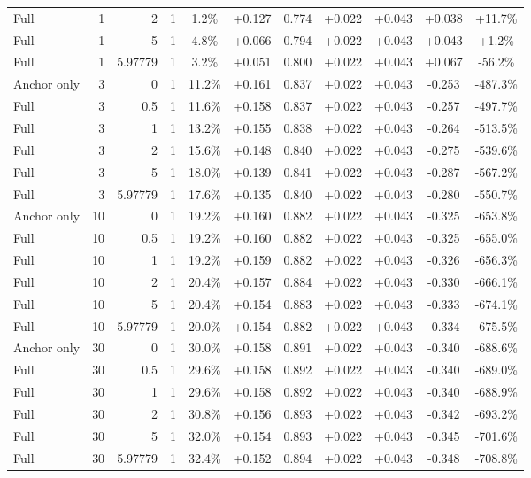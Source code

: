\begin{table}[htbp]
\begin{tabular}{lrrrccccccc}
Full & 1 & 2 & 1 & 1.2\% & +0.127 & 0.774 & +0.022 & +0.043 & +0.038 & +11.7\% \\
Full & 1 & 5 & 1 & 4.8\% & +0.066 & 0.794 & +0.022 & +0.043 & +0.043 & +1.2\% \\
Full & 1 & 5.97779 & 1 & 3.2\% & +0.051 & 0.800 & +0.022 & +0.043 & +0.067 & -56.2\% \\
Anchor only & 3 & 0 & 1 & 11.2\% & +0.161 & 0.837 & +0.022 & +0.043 & -0.253 & -487.3\% \\
Full & 3 & 0.5 & 1 & 11.6\% & +0.158 & 0.837 & +0.022 & +0.043 & -0.257 & -497.7\% \\
Full & 3 & 1 & 1 & 13.2\% & +0.155 & 0.838 & +0.022 & +0.043 & -0.264 & -513.5\% \\
Full & 3 & 2 & 1 & 15.6\% & +0.148 & 0.840 & +0.022 & +0.043 & -0.275 & -539.6\% \\
Full & 3 & 5 & 1 & 18.0\% & +0.139 & 0.841 & +0.022 & +0.043 & -0.287 & -567.2\% \\
Full & 3 & 5.97779 & 1 & 17.6\% & +0.135 & 0.840 & +0.022 & +0.043 & -0.280 & -550.7\% \\
Anchor only & 10 & 0 & 1 & 19.2\% & +0.160 & 0.882 & +0.022 & +0.043 & -0.325 & -653.8\% \\
Full & 10 & 0.5 & 1 & 19.2\% & +0.160 & 0.882 & +0.022 & +0.043 & -0.325 & -655.0\% \\
Full & 10 & 1 & 1 & 19.2\% & +0.159 & 0.882 & +0.022 & +0.043 & -0.326 & -656.3\% \\
Full & 10 & 2 & 1 & 20.4\% & +0.157 & 0.884 & +0.022 & +0.043 & -0.330 & -666.1\% \\
Full & 10 & 5 & 1 & 20.4\% & +0.154 & 0.883 & +0.022 & +0.043 & -0.333 & -674.1\% \\
Full & 10 & 5.97779 & 1 & 20.0\% & +0.154 & 0.882 & +0.022 & +0.043 & -0.334 & -675.5\% \\
Anchor only & 30 & 0 & 1 & 30.0\% & +0.158 & 0.891 & +0.022 & +0.043 & -0.340 & -688.6\% \\
Full & 30 & 0.5 & 1 & 29.6\% & +0.158 & 0.892 & +0.022 & +0.043 & -0.340 & -689.0\% \\
Full & 30 & 1 & 1 & 29.6\% & +0.158 & 0.892 & +0.022 & +0.043 & -0.340 & -688.9\% \\
Full & 30 & 2 & 1 & 30.8\% & +0.156 & 0.893 & +0.022 & +0.043 & -0.342 & -693.2\% \\
Full & 30 & 5 & 1 & 32.0\% & +0.154 & 0.893 & +0.022 & +0.043 & -0.345 & -701.6\% \\
Full & 30 & 5.97779 & 1 & 32.4\% & +0.152 & 0.894 & +0.022 & +0.043 & -0.348 & -708.8\% \\

\end{tabular}
\end{table}
